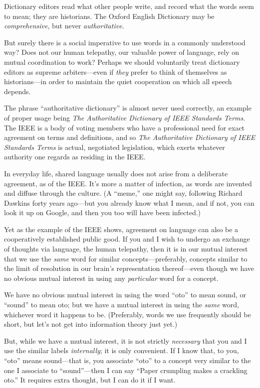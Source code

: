 {
 Dictionary editors read what other people write, and record what
the words seem to mean; they are historians. The Oxford English
Dictionary may be \textit{comprehensive}, but never
\textit{authoritative.}}

{
 But surely there is a social imperative to use words in a commonly
understood way? Does not our human telepathy, our valuable power of
language, rely on mutual coordination to work? Perhaps we should
voluntarily treat dictionary editors as supreme arbiters---even if
\textit{they} prefer to think of themselves as historians---in order to
maintain the quiet cooperation on which all speech depends.}

{
 The phrase ``authoritative
dictionary'' is almost never used correctly, an
example of proper usage being \textit{The Authoritative Dictionary of
IEEE Standards Terms}. The IEEE is a body of voting members who have a
professional need for exact agreement on terms and definitions, and so
\textit{The Authoritative Dictionary of IEEE Standards Terms} is
actual, negotiated legislation, which exerts whatever authority one
regards as residing in the IEEE.}

{
 In everyday life, shared language usually does not arise from a
deliberate agreement, as of the IEEE. It's more a
matter of infection, as words are invented and diffuse through the
culture. (A ``meme,'' one might say,
following Richard Dawkins forty years ago---but you already know what I
mean, and if not, you can look it up on Google, and then you too will
have been infected.)}

{
 Yet as the example of the IEEE shows, agreement on language can
also be a cooperatively established public good. If you and I wish to
undergo an exchange of thoughts via language, the human telepathy, then
it is in our mutual interest that we use the \textit{same} word for
similar concepts---preferably, concepts similar to the limit of
resolution in our brain's representation thereof---even
though we have no obvious mutual interest in using any
\textit{particular} word for a concept.}

{
 We have no obvious mutual interest in using the word
``oto'' to mean sound, or
``sound'' to mean oto; but we have a
mutual interest in using the \textit{same} word, whichever word it
happens to be. (Preferably, words we use frequently should be short,
but let's not get into information theory just yet.)}

{
 But, while we have a mutual interest, it is not strictly
\textit{necessary} that you and I use the similar labels
\textit{internally}; it is only convenient. If I know that, to you,
``oto'' means sound---that is, you
associate ``oto'' to a concept very
similar to the one I associate to
``sound''---then I can say
``Paper crumpling makes a crackling
oto.'' It requires extra thought, but I can do it if
I want.}


